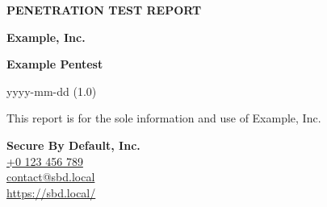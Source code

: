 \documentclass[a4paper]{article}
\begin{document}
\pagestyle{fancy}
\fancyhf{} %

\begin{titlepage}

  \vspace*{\fill}

  \begin{center}
  \end{center}

  \vfill
  
  {
    \Huge \textbf{\MakeUppercase{Penetration Test Report}}
    \vspace{1ex}
  }

  {
    \Large \textbf{Example, Inc.}
  }

  {
    \Large \textbf{Example Pentest}
  }

  yyyy-mm-dd (1.0)
\end{titlepage}


\fancyfoot[C]{\thepage}

{
  \vspace*{\fill}

  This report is for the sole information and use of Example, Inc.

  \textbf{Secure By Default, Inc.} \\
  \href{tel:+0123456789}{+0 123 456 789} \\
  \href{mailto:contact@sbd.local}{contact@sbd.local} \\
  \href{https://sbd.local/}{https://sbd.local/}
}
\end{document}
